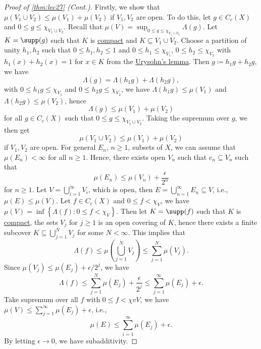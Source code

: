 \begin{proof}[Proof of \autoref{thm:lec27} (Cont.)]
	Firstly, we show that \(\mu (V_1 \cup V_2) \leq \mu (V_1) + \mu (V_2)\) if \(V_1, V_2\) are open. To do this, let \(g\in C_c(X)\) and \(0 \leq g \leq \chi _{V_1 \cup V_2}\). Recall that \(\mu (V) = \sup _{0 \leq g\leq \chi _{V_1 \cup V_2}} \Lambda (g)\). Let \(K = \supp(g) \) such that \(K\) is \hyperref[def:compact]{compact} and \(K \subseteq V_1 \cup V_2\). Choose a partition of unity \(h_1, h_2\) such that \(0 \leq h_1, h_2 \leq 1\) and \(0 \leq h_1 \leq \chi _{V_1}\), \(0 \leq h_2 \leq \chi _{V_2}\) with \(h_1(x) + h_2(x) = 1\) for \(x\in K\) from the \hyperref[thm:Urysohn-lemma]{Urysohn's lemma}. Then \(g \coloneqq h_1 g + h_2 g\), we have
	\[
		\Lambda (g) = \Lambda (h_1 g) + \Lambda (h_2 g),
	\]
	with \(0 \leq h_1 g \leq \chi _{V_1}\) and \(0 \leq h_2 g \leq \chi _{V_2}\), we have \(\Lambda (h_1 g) \leq \mu (V_1)\) and \(\Lambda (h_2 g)\leq \mu (V_2)\), hence
	\[
		\Lambda (g) \leq \mu (V_1) + \mu (V_2)
	\]
	for all \(g\in C_c(X)\) such that \(0 \leq g \leq \chi _{V_1 \cup V_2}\). Taking the supremum over \(g\), we then get
	\[
		\mu (V_1 \cup V_2) \leq \mu (V_1) + \mu (V_2)
	\]
	if \(V_1, V_2\) are open. For general \(E_n\), \(n \geq 1\), subsets of \(X\), we can assume that \(\mu (E_n) < \infty \) for all \(n \geq 1\). Hence, there exists open \(V_n\) such that \(e_n \subseteq V_n\) such that
	\[
		\mu (E_n) \leq \mu (V_n) + \frac{\epsilon}{2^n}
	\]
	for \(n\geq 1\). Let \(V = \bigcup_{i=1}^{\infty} V_i\), which is open, then \(E = \bigcup_{n=1}^{\infty} E_n \subseteq V\), i.e., \(\mu (E) \leq \mu (V)\). Let \(f\in C_c(X)\) and \(0 \leq f < \chi _V\), we have \(\mu (V) = \inf \left\{ \Lambda (f) \colon 0 \leq f < \chi _V \right\} \). Then let \(K = \supp(f) \) such that \(K\) is \hyperref[def:compact]{compact}, the sets \(V_j\) for \(j \geq 1\) is an open covering of \(K\), hence there exists a finite subcover \(K \subseteq \bigcup_{j=1}^{N} V_j\) for some \(N < \infty \). This implies that
	\[
		\Lambda (f) \leq \mu \left( \bigcup_{j=1}^{N} V_j \right) \leq \sum_{j=1}^{N} \mu (V_j).
	\]
	Since \(\mu (V_j) \leq \mu (E_j) + \epsilon / 2^j\), we have
	\[
		\Lambda (f) \leq \sum_{j=1}^{N} \mu (E_j) + \frac{\epsilon}{2^j} \leq \sum_{j=1}^{\infty} \mu (E_j) + \epsilon.
	\]
	Take supremum over all \(f\) with \(0 \leq f < \chi vV\), we have \(\mu (V) \leq \sum_{j=1}^{\infty} \mu (E_j) + \epsilon \), i.e.,
	\[
		\mu (E) \leq \sum_{i=1}^{\infty} \mu (E_j) + \epsilon.
	\]
	By letting \(\epsilon \to 0\), we have subadditivity.


\end{proof}
